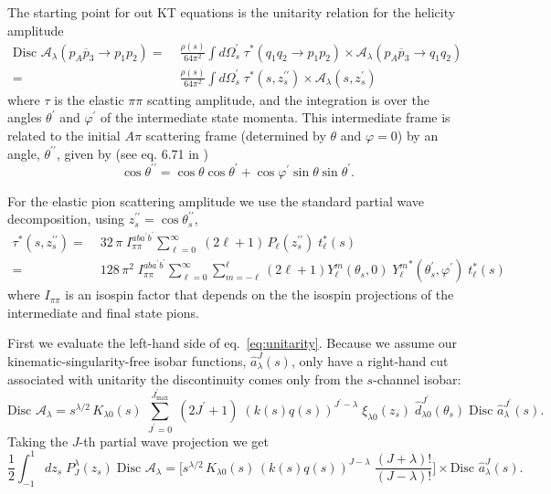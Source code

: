 \documentclass[10pt, aps,prd,amsmath,amssymb,superscriptaddress,onecolumn,
nofootinbib,showpacs,preprintnumbers]{revtex4-1}
\newcommand{\jpmax}{{J^\prime_\text{max}}}
\newcommand{\Disc}{\text{Disc }}
\begin{document}
The starting point for out KT equations is the unitarity relation for the helicity amplitude
  \begin{align}
    \label{eq:unitarity}
    \Disc \mathcal{A}_\lambda(p_A \overline{p}_3 \to p_1 p_2 ) =&\; \frac{\rho(s)}{64 \pi^2} \int d\Omega_s^\prime  \; \tau^*(q_1q_2 \to p_1p_2) \times \mathcal{A}_\lambda(p_A \overline{p}_{3} \to q_1 q_2 ) \nonumber \\
    =& \; \frac{\rho(s)}{64 \pi^2} \int d\Omega_s^\prime  \; \tau^*(s,z_s^{\prime\prime}) \times \mathcal{A}_\lambda(s,z_s^{\prime})
  \end{align}
where \(\tau\) is the elastic \(\pi\pi\) scatting amplitude, and the integration is over the angles \(\theta^\prime\) and \(\varphi^\prime\) of the intermediate state momenta. This intermediate frame is related to the initial \(A\pi\) scattering frame (determined by \(\theta\) and \(\varphi = 0\)) by an angle, \(\theta^{\prime\prime}\), given by (see eq. 6.71 in \cite{MS})
  \begin{equation}
    \cos \theta^{\prime\prime} = \cos \theta \cos \theta^\prime + \cos \varphi^\prime \sin\theta \sin \theta^\prime.
  \end{equation}

For the elastic pion scattering amplitude we use the standard partial wave decomposition, using \( z_s^{\prime\prime} = \cos \theta_s^{\prime\prime}\),
  \begin{align}
    \label{eq:elastic-pion}
    \tau^*(s, z_s^{\prime\prime}) =& \; 32 \, \pi \; I^{aba^\prime b^\prime}_{\pi\pi} \sum_{\ell=0  }^\infty \; (2\ell+1) \, P_{\ell}(z_s^{\prime\prime}) \; t_\ell^*(s) \nonumber \\
    =& \; 128 \, \pi^2 \; I_{\pi\pi}^{aba^\prime b^\prime} \sum_{\ell=0}^\infty \sum_{m=-\ell}^{\ell} (2\ell +1 ) Y^m_\ell(\theta_s,0) \; {Y^m_\ell}^*(\theta_s^\prime, \varphi^\prime) \; t_\ell^*(s)
  \end{align}
where \(I_{\pi\pi}\) is an isospin factor that depends on the the isospin projections of the intermediate and final state pions.

First we evaluate the left-hand side of eq.~\ref{eq:unitarity}. Because we assume our kinematic-singularity-free isobar functions, \(\hat{a}_\lambda^J(s)\), only have a right-hand cut associated with unitarity the discontinuity comes only from the \(s\)-channel isobar:
  \begin{equation}
    \label{eq:discontinuity}
    \Disc \mathcal{A}_\lambda = s^{\lambda/2}\, K_{\lambda 0}(s) \; \sum_{J^\prime=0}^\jpmax \; (2 J^\prime +1) \; (k(s)q(s))^{J^\prime-\lambda}  \; \xi_{\lambda 0}(z_s)
    \; \hat{d}^{J^\prime}_{\lambda 0}(\theta_s) \; \Disc \hat{a}_\lambda^{J^\prime}(s).
  \end{equation}
Taking the \(J\)-th partial wave projection we get
  \begin{equation}
    \label{eq:pw-disc}
    \frac{1}{2} \int_{-1}^1 dz_s \; P^\lambda_{J}(z_s) \; \Disc \mathcal{A}_\lambda =
    \bigg[ s^{\lambda/2} \, K_{\lambda 0}(s) \, (k(s)q(s))^{J-\lambda} \; \frac{(J+\lambda)!}{(J-
    \lambda)!} \bigg] \times \Disc \hat{a}^J_\lambda(s).
  \end{equation}
\end{document}
